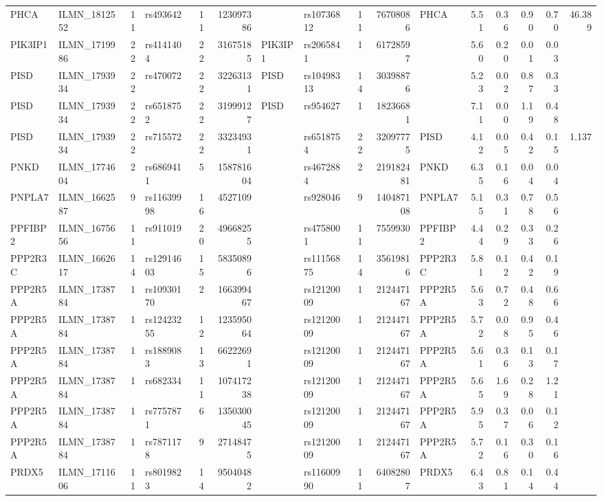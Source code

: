 \documentclass{article}
\begin{document}
\begin{landscape}
{\begin{ThreePartTable}
\begin{longtable}{|llr|lrrl|lrrl|rrrr|r|}
PHCA & ILMN\_1812552 & 11 & rs493642 & 11 & 123097386 &  & rs10736812 & 11 & 76708086 & PHCA & 5.51 & 0.36 & 0.90 & 0.70 & 46.389 \\
PIK3IP1 & ILMN\_1719986 & 22 & rs4141404 & 22 & 31675185 & PIK3IP1 & rs2065841 & 1 & 61728597 &  & 5.60 & 0.20 & 0.01 & 0.03 &  \\
PISD & ILMN\_1793934 & 22 & rs470072 & 22 & 32263131 & PISD & rs10498313 & 14 & 30398876 &  & 5.23 & 0.02 & 0.87 & 0.33 &  \\
PISD & ILMN\_1793934 & 22 & rs6518752 & 22 & 31999127 & PISD & rs954627 & 1 & 18236681 &  & 7.11 & 0.00 & 1.19 & 0.48 &  \\
PISD & ILMN\_1793934 & 22 & rs715572 & 22 & 33234931 &  & rs6518754 & 22 & 32097775 & PISD & 4.12 & 0.05 & 0.42 & 0.15 & 1.137 \\
PNKD & ILMN\_1774604 & 2 & rs6869411 & 5 & 158781604 &  & rs4672884 & 2 & 219182481 & PNKD & 6.35 & 0.16 & 0.04 & 0.04 &  \\
PNPLA7 & ILMN\_1662587 & 9 & rs11639998 & 16 & 4527109 &  & rs928046 & 9 & 140487108 & PNPLA7 & 5.15 & 0.31 & 0.78 & 0.56 &  \\
PPFIBP2 & ILMN\_1675656 & 11 & rs911019 & 20 & 49668255 &  & rs4758001 & 11 & 7559930 & PPFIBP2 & 4.44 & 0.29 & 0.33 & 0.26 &  \\
PPP2R3C & ILMN\_1662617 & 14 & rs12914603 & 15 & 58350896 &  & rs11156875 & 14 & 35619816 & PPP2R3C & 5.81 & 0.12 & 0.42 & 0.19 &  \\
PPP2R5A & ILMN\_1738784 & 1 & rs10930170 & 2 & 166399467 &  & rs12120009 & 1 & 212447167 & PPP2R5A & 5.63 & 0.72 & 0.48 & 0.66 &  \\
PPP2R5A & ILMN\_1738784 & 1 & rs12423255 & 12 & 123595064 &  & rs12120009 & 1 & 212447167 & PPP2R5A & 5.72 & 0.08 & 0.95 & 0.46 &  \\
PPP2R5A & ILMN\_1738784 & 1 & rs1889083 & 13 & 66222691 &  & rs12120009 & 1 & 212447167 & PPP2R5A & 5.61 & 0.36 & 0.13 & 0.17 &  \\
PPP2R5A & ILMN\_1738784 & 1 & rs682334 & 11 & 107417238 &  & rs12120009 & 1 & 212447167 & PPP2R5A & 5.65 & 1.69 & 0.28 & 1.21 &  \\
PPP2R5A & ILMN\_1738784 & 1 & rs7757871 & 6 & 135030045 &  & rs12120009 & 1 & 212447167 & PPP2R5A & 5.95 & 0.37 & 0.06 & 0.12 &  \\
PPP2R5A & ILMN\_1738784 & 1 & rs7871178 & 9 & 27148475 &  & rs12120009 & 1 & 212447167 & PPP2R5A & 5.72 & 0.16 & 0.30 & 0.16 &  \\
PRDX5 & ILMN\_1711606 & 11 & rs8019823 & 14 & 95040482 &  & rs11600990 & 11 & 64082807 & PRDX5 & 6.43 & 0.81 & 0.14 & 0.44 &  \\

\end{longtable}
\end{ThreePartTable}}
\end{landscape}
\end{document}
